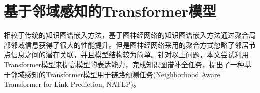 \chapter{基于邻域感知的Transformer模型}



相较于传统的知识图谱嵌入方法，基于图神经网络的知识图谱嵌入方法通过聚合局部邻域信息获得了很大的性能提升。但是图神经网络采用的聚合方式忽略了邻居节点信息之间的潜在关联，并且模型结构较为简单。针对以上问题，本文尝试利用Transformer模型来提高模型的表达能力，完成知识图谱补全任务，提出了一种基于邻域感知的Transformer模型用于链路预测任务(Neighborhood Aware Transformer for Link Prediction, NATLP)。







